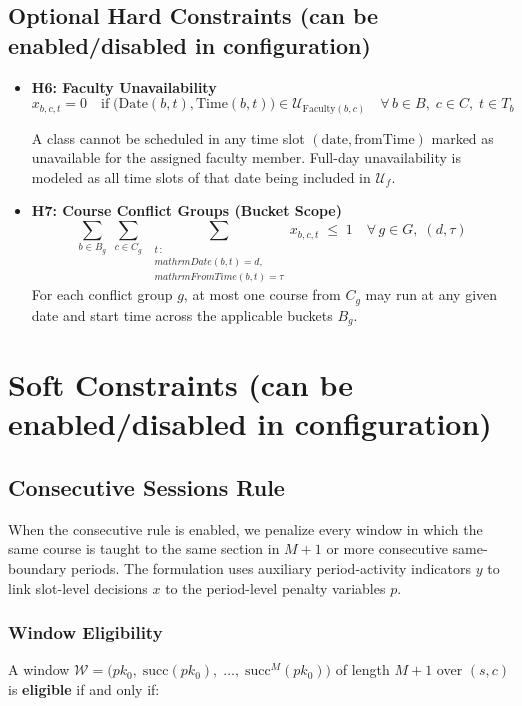 \documentclass{article}
\begin{document}
\subsection{Optional Hard Constraints (can be enabled/disabled in configuration)}
\begin{itemize}
    \item \textbf{H6: Faculty Unavailability}
    \begin{equation}
        x_{b,c,t} = 0
        \quad \text{if}\;
        \bigl(\mathrm{Date}(b,t), \mathrm{Time}(b,t)\bigr)
        \in \mathcal{U}_{\mathrm{Faculty}(b,c)}
        \quad \forall\, b \in B,\; c \in C,\; t \in T_b
    \end{equation}

    A class cannot be scheduled in any time slot $(\text{date}, \text{fromTime})$ marked as unavailable for the assigned faculty member. Full-day unavailability is modeled as all time slots of that date being included in $\mathcal{U}_f$.

    \item \textbf{H7: Course Conflict Groups (Bucket Scope)}
    \begin{equation}
        \sum_{b \in B_g}\;\sum_{c \in C_g}
        \;\sum_{\substack{t\,:\\mathrm{Date}(b,t)=d,\\mathrm{FromTime}(b,t)=\tau}}
        x_{b,c,t} \;\leq\; 1
        \quad \forall\, g \in G,\;(d,\tau)
    \end{equation}
    For each conflict group $g$, at most one course from $C_g$ may run at any given date and start time across the applicable buckets $B_g$.
\end{itemize}

\section{Soft Constraints \large (can be enabled/disabled in configuration)}
\subsection{Consecutive Sessions Rule}
When the consecutive rule is enabled, we penalize every window in which the same course is taught to the same section in $M+1$ or more consecutive same-boundary periods. The formulation uses auxiliary period-activity indicators $y$ to link slot-level decisions $x$ to the period-level penalty variables $p$.

\subsubsection*{Window Eligibility}
A window $\mathcal{W} = \bigl(pk_0,\;\mathrm{succ}(pk_0),\;\ldots,\;\mathrm{succ}^M(pk_0)\bigr)$ of length $M+1$ over $(s, c)$ is \textbf{eligible} if and only if:
\end{document}
